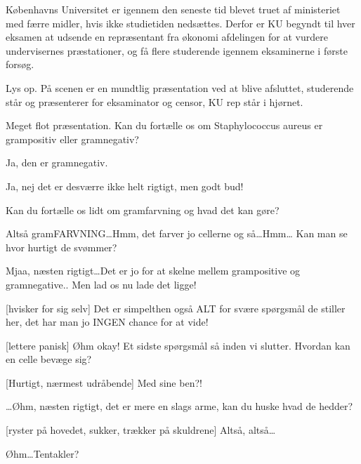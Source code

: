 \documentclass[a4paper,11pt]{article}
\begin{document}
\begin{sketch}


Københavns Universitet er igennem den seneste tid blevet truet af ministeriet med færre midler, hvis ikke studietiden nedsættes. Derfor er KU begyndt til hver eksamen at udsende en repræsentant fra økonomi afdelingen for at vurdere undervisernes præstationer, og få flere studerende igennem eksaminerne i første forsøg.

\scene Lys op. På scenen er en mundtlig præsentation ved at blive afsluttet, studerende står og præsenterer for eksaminator og censor, KU rep står i hjørnet.

Meget flot præsentation. Kan du fortælle os om Staphylococcus aureus er grampositiv eller 
gramnegativ?

Ja, den er gramnegativ.

Ja, nej det er desværre ikke helt rigtigt, men godt bud!



Kan du fortælle os lidt om gramfarvning og hvad det kan gøre?

Altså gramFARVNING\ldots Hmm, det farver jo cellerne og så\ldots Hmm\ldots {} Kan man se hvor hurtigt de svømmer?

 Mjaa, næsten rigtigt\ldots Det er jo for at skelne mellem grampositive og gramnegative.. Men lad os nu lade det ligge! 

[hvisker for sig selv] Det er simpelthen også ALT for svære spørgsmål de stiller her, det har man jo INGEN chance for at vide!

[lettere panisk] Øhm okay! Et sidste spørgsmål så inden vi slutter.  Hvordan kan en celle bevæge sig?

[Hurtigt, nærmest udråbende] Med sine ben?!

\ldots Øhm, næsten rigtigt, det er mere en slags arme, kan du huske hvad de hedder?

[ryster på hovedet, sukker, trækker på skuldrene] Altså, altså\ldots

Øhm\ldots Tentakler?


\end{sketch}
\end{document}
